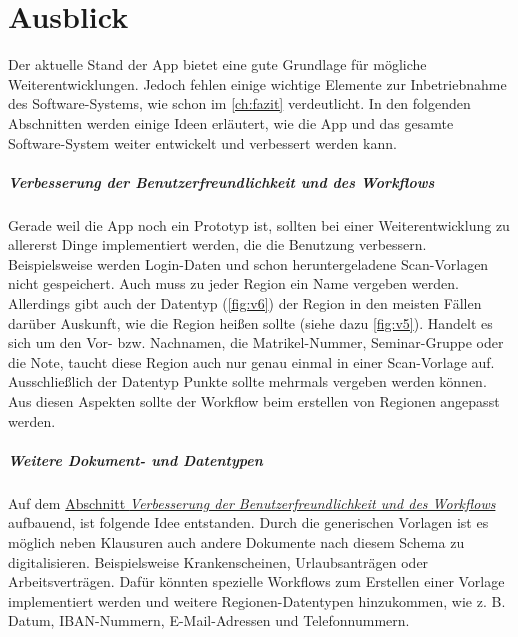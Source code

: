 \documentclass[notables, nomenclature, oneside, 150]{HSMW-Thesis}
\begin{document}
		
\chapter{Ausblick}\label{ch:ausblick}
	Der aktuelle Stand der App bietet eine gute Grundlage für mögliche Weiterentwicklungen. Jedoch fehlen einige wichtige Elemente zur Inbetriebnahme des Software-Systems, wie schon im \autoref{ch:fazit} verdeutlicht. In den folgenden Abschnitten werden einige Ideen erläutert, wie die App und das gesamte Software-System weiter entwickelt und verbessert werden kann.

	\paragraph*{Verbesserung der Benutzerfreundlichkeit und des Workflows} \label{pa:benutzer} 
		Gerade weil die App noch ein Prototyp ist, sollten bei einer Weiterentwicklung zu allererst Dinge implementiert werden, die die Benutzung verbessern. Beispielsweise werden Login-Daten und schon heruntergeladene Scan-Vorlagen nicht gespeichert. Auch muss zu jeder Region ein Name vergeben werden. Allerdings gibt auch der Datentyp (\ref{fig:v6}) der Region in den meisten Fällen darüber Auskunft, wie die Region heißen sollte (siehe dazu \autoref{fig:v5}). Handelt es sich um den Vor- bzw. Nachnamen, die Matrikel-Nummer, Seminar-Gruppe oder die Note, taucht diese Region auch nur genau einmal in einer Scan-Vorlage auf. Ausschließlich der Datentyp Punkte sollte mehrmals vergeben werden können. Aus diesen Aspekten sollte der Workflow beim erstellen von Regionen angepasst werden. 
	
	\paragraph*{Weitere Dokument- und Datentypen} 
		Auf dem \hyperref[pa:benutzer]{Abschnitt \textit{Verbesserung der Benutzerfreundlichkeit und des Workflows}} \xspace aufbauend, ist folgende Idee entstanden. Durch die generischen Vorlagen ist es möglich neben Klausuren auch andere Dokumente nach diesem Schema zu digitalisieren. Beispielsweise Krankenscheinen, Urlaubsanträgen oder Arbeitsverträgen. Dafür könnten spezielle Workflows zum Erstellen einer Vorlage implementiert werden und weitere Regionen-Datentypen hinzukommen, wie z. B. Datum, IBAN-Nummern, E-Mail-Adressen und Telefonnummern.
	
\end{document}

